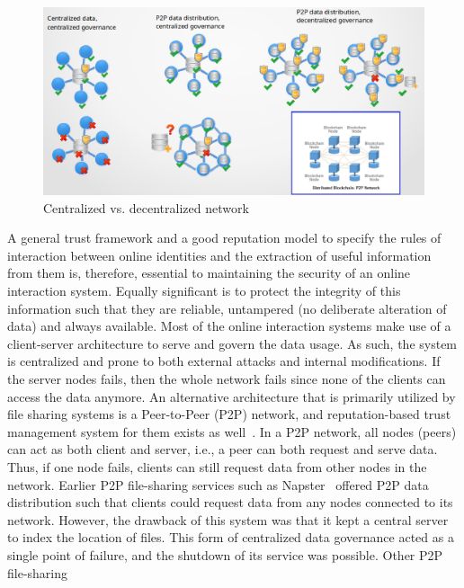 \begin{figure}[H]
	\begin{center}
		\includegraphics[width=1.0\textwidth]{Images/WhyBlockchain.eps}
		\caption{Centralized vs. decentralized network}
		\label{fig:WhyBlockchain}
	\end{center}
\end{figure}
\vspace{-8mm}
A general trust framework and a good reputation model to specify the rules of
interaction between online identities and the extraction of useful information
from them is, therefore, essential to maintaining the security of an online
interaction system. Equally significant is to protect the integrity of this
information such that they are reliable, untampered (no deliberate alteration
of data) and always available. Most of the online interaction systems make use
of a client-server architecture to serve and govern the data usage. As such,
the system is centralized and prone to both external attacks and internal
modifications. If the server nodes fails, then the whole network fails since
none of the clients can access the data anymore. An alternative architecture
that is primarily utilized by file sharing systems is a Peer-to-Peer (P2P)
network, and reputation-based trust management system for them exists as
well~\cite{selcuk2004reputation}. In a P2P network, all nodes (peers) can act
as both client and server, i.e., a peer can both request and serve data.  Thus,
if one node fails, clients can still request data from other nodes in the
network. Earlier P2P file-sharing services such as
Napster~\cite{stern2000napster} offered P2P data distribution such that clients
could request data from any nodes connected to its network. However, the
drawback of this system was that it kept a central server to index the location
of files. This form of centralized data governance acted as a single point of
failure, and the shutdown of its service was possible. Other P2P file-sharing
